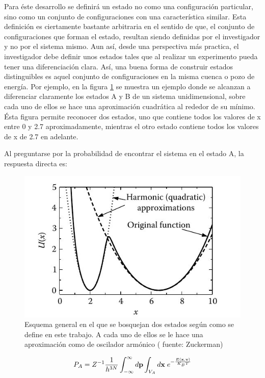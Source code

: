 \documentclass [11pt]{article}
\begin{document}
Para éste desarrollo se definirá un estado no como una configuración particular, sino como un conjunto de configuraciones con una característica similar. Esta definición es ciertamente bastante arbitraria en el sentido de que, el conjunto de configuraciones que forman el estado, resultan siendo definidas por el investigador y no por el sistema mismo. Aun así, desde una perspectiva más practica, el investigador debe definir unos estados tales que al realizar un experimento pueda tener una diferenciación clara. Así, una buena forma de construir estados distinguibles es aquel conjunto de configuraciones en la misma cuenca o pozo de energía. Por ejemplo, en la figura \ref{estados} se muestra un ejemplo donde se alcanzan a diferenciar claramente los estados A y B de un sistema unidimensional, sobre cada uno de ellos se hace una aproximación cuadrática al rededor de su mínimo. Ésta figura permite reconocer dos estados, uno que contiene todos los valores de x entre 0 y 2.7 aproximadamente, mientras el otro estado contiene todos los valores de x de 2.7 en adelante. 

Al preguntarse por la probabilidad de encontrar el sistema en el estado A, la respuesta directa es:

\begin{figure}[t]
\centering
\includegraphics[width=0.7\linewidth]{estados}
\caption{Esquema general en el que se bosquejan dos estados según como se define en este trabajo. A cada uno de ellos se le hace una aproximación como de oscilador armónico ({\color{red} fuente: Zuckerman})}
\label{estados}
\end{figure}

 
 
 \begin{equation}
     P_A=Z^{-1} \frac{1}{h^{3N}} \int_{-\infty}^{\infty}d{\bf p}\int_{V_A}d{\bf x}{\hspace{0.1 cm}}e^{-\frac{E({\bf x},{\bf v})}{K_BT}}
 \end{equation}
 
\end{document}
